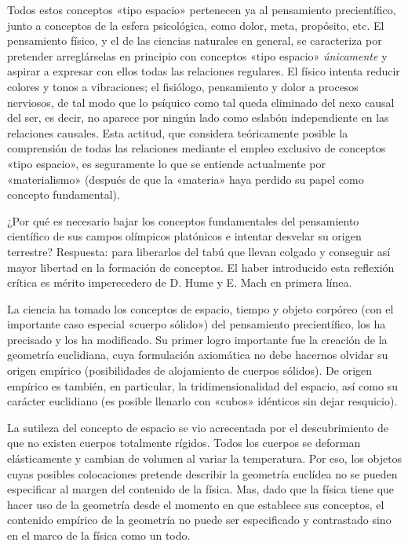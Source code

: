 \documentclass[spanish]{book}
\begin{document}
Todos estos conceptos «tipo espacio» pertenecen ya al pensamiento precientífico,
junto a conceptos de la esfera psicológica, como dolor, meta, propósito, etc. El
pensamiento físico, y el de las ciencias naturales en general, se caracteriza por
pretender arreglárselas en principio con conceptos «tipo espacio» \textit{únicamente} y aspirar
a expresar con ellos todas las relaciones regulares. El físico intenta reducir colores y
tonos a vibraciones; el fisiólogo, pensamiento y dolor a procesos nerviosos, de tal
modo que lo psíquico como tal queda eliminado del nexo causal del ser, es decir, no
aparece por ningún lado como eslabón independiente en las relaciones causales. Esta
actitud, que considera teóricamente posible la comprensión de todas las relaciones
mediante el empleo exclusivo de conceptos «tipo espacio», es seguramente lo que se
entiende actualmente por «materialismo» (después de que la «materia» haya perdido su
papel como concepto fundamental).

¿Por qué es necesario bajar los conceptos fundamentales del pensamiento científico
de sus campos olímpicos platónicos e intentar desvelar su origen terrestre? Respuesta:
para liberarlos del tabú que llevan colgado y conseguir así mayor libertad en la
formación de conceptos. El haber introducido esta reflexión crítica es mérito
imperecedero de D. Hume y E. Mach en primera línea.

La ciencia ha tomado los conceptos de espacio, tiempo y objeto corpóreo (con el
importante caso especial «cuerpo sólido») del pensamiento precientífico, los ha
precisado y los ha modificado. Su primer logro importante fue la creación de la
geometría euclidiana, cuya formulación axiomática no debe hacernos olvidar su origen
empírico (posibilidades de alojamiento de cuerpos sólidos). De origen empírico es
también, en particular, la tridimensionalidad del espacio, así como su carácter
euclidiano (es posible llenarlo con «cubos» idénticos sin dejar resquicio).

La sutileza del concepto de espacio se vio acrecentada por el descubrimiento de que
no existen cuerpos totalmente rígidos. Todos los cuerpos se deforman elásticamente y
cambian de volumen al variar la temperatura. Por eso, los objetos cuyas posibles
colocaciones pretende describir la geometría euclídea no se pueden especificar al
margen del contenido de la física. Mas, dado que la física tiene que hacer uso de la
geometría desde el momento en que establece sus conceptos, el contenido empírico de
la geometría no puede ser especificado y contrastado sino en el marco de la física
como un todo.
\end{document}
